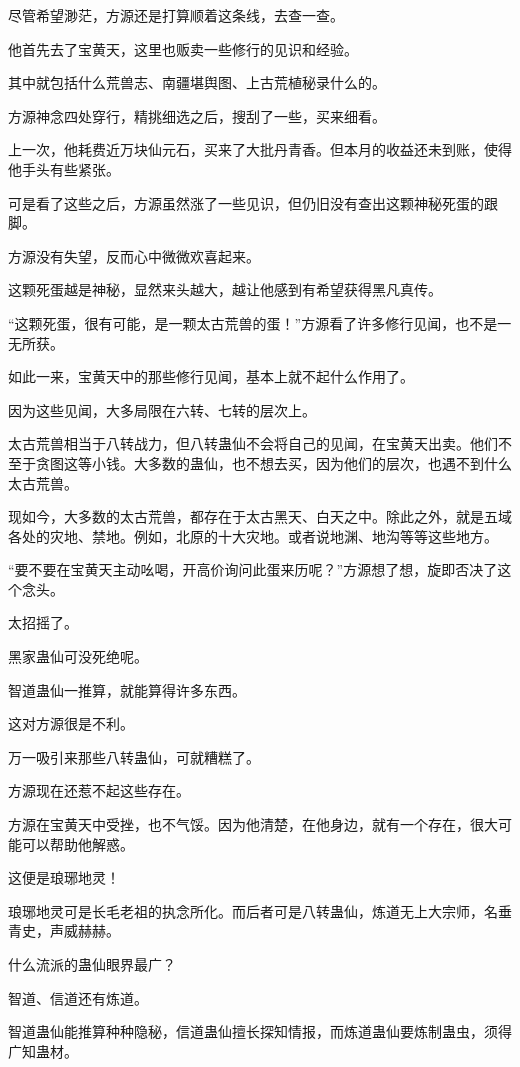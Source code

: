 \begin{this_body}
尽管希望渺茫，方源还是打算顺着这条线，去查一查。

他首先去了宝黄天，这里也贩卖一些修行的见识和经验。

其中就包括什么荒兽志、南疆堪舆图、上古荒植秘录什么的。

方源神念四处穿行，精挑细选之后，搜刮了一些，买来细看。

上一次，他耗费近万块仙元石，买来了大批丹青香。但本月的收益还未到账，使得他手头有些紧张。

可是看了这些之后，方源虽然涨了一些见识，但仍旧没有查出这颗神秘死蛋的跟脚。

方源没有失望，反而心中微微欢喜起来。

这颗死蛋越是神秘，显然来头越大，越让他感到有希望获得黑凡真传。

“这颗死蛋，很有可能，是一颗太古荒兽的蛋！”方源看了许多修行见闻，也不是一无所获。

如此一来，宝黄天中的那些修行见闻，基本上就不起什么作用了。

因为这些见闻，大多局限在六转、七转的层次上。

太古荒兽相当于八转战力，但八转蛊仙不会将自己的见闻，在宝黄天出卖。他们不至于贪图这等小钱。大多数的蛊仙，也不想去买，因为他们的层次，也遇不到什么太古荒兽。

现如今，大多数的太古荒兽，都存在于太古黑天、白天之中。除此之外，就是五域各处的灾地、禁地。例如，北原的十大灾地。或者说地渊、地沟等等这些地方。

“要不要在宝黄天主动吆喝，开高价询问此蛋来历呢？”方源想了想，旋即否决了这个念头。

太招摇了。

黑家蛊仙可没死绝呢。

智道蛊仙一推算，就能算得许多东西。

这对方源很是不利。

万一吸引来那些八转蛊仙，可就糟糕了。

方源现在还惹不起这些存在。

方源在宝黄天中受挫，也不气馁。因为他清楚，在他身边，就有一个存在，很大可能可以帮助他解惑。

这便是琅琊地灵！

琅琊地灵可是长毛老祖的执念所化。而后者可是八转蛊仙，炼道无上大宗师，名垂青史，声威赫赫。

什么流派的蛊仙眼界最广？

智道、信道还有炼道。

智道蛊仙能推算种种隐秘，信道蛊仙擅长探知情报，而炼道蛊仙要炼制蛊虫，须得广知蛊材。


\end{this_body}
